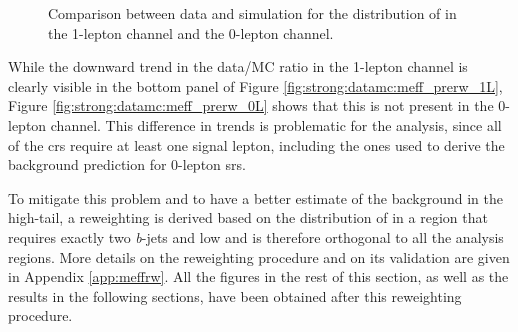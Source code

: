 \begin{figure}[h]
\centering 
{}
\caption{Comparison between data and simulation for the distribution of \meff in  the 1-lepton channel and 
the 0-lepton channel.
}
\label{fig:strong:datamc:meff_prerw}
\end{figure}

While the downward trend in the data/MC ratio in the 1-lepton channel is clearly visible in the bottom panel of Figure \ref{fig:strong:datamc:meff_prerw_1L},
Figure \ref{fig:strong:datamc:meff_prerw_0L} shows that this is not present in the 0-lepton channel.
This difference in trends is problematic for the analysis, since all of the \glspl{cr} require at least one signal lepton, 
including the ones used to derive the background prediction for 0-lepton \glspl{sr}. 

To mitigate this problem and to have a better estimate of the background in the high-\meff tail, a reweighting is derived 
based on the distribution of \meff in a region that requires exactly two \textit{b}-jets and low \mtb and is therefore
 orthogonal to all the analysis regions. More details on the reweighting procedure and on its validation are given in Appendix \ref{app:meffrw}.
All the figures in the rest of this section, as well as the results in the following sections, 
have been obtained after this reweighting procedure.


